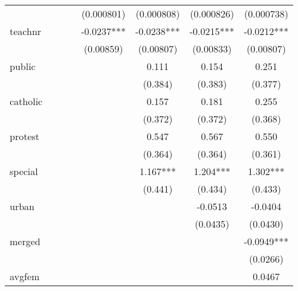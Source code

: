 \begin{table}[htbp]
\begin{tabular}{l*{7}{c}}
            &               &               &               &  (0.000801)   &  (0.000808)   &  (0.000826)   &  (0.000738)   \\
[1em]
teachnr     &               &               &               &     -0.0237***&     -0.0238***&     -0.0215***&     -0.0212***\\
            &               &               &               &   (0.00859)   &   (0.00807)   &   (0.00833)   &   (0.00807)   \\
[1em]
public      &               &               &               &               &       0.111   &       0.154   &       0.251   \\
            &               &               &               &               &     (0.384)   &     (0.383)   &     (0.377)   \\
[1em]
catholic    &               &               &               &               &       0.157   &       0.181   &       0.255   \\
            &               &               &               &               &     (0.372)   &     (0.372)   &     (0.368)   \\
[1em]
protest     &               &               &               &               &       0.547   &       0.567   &       0.550   \\
            &               &               &               &               &     (0.364)   &     (0.364)   &     (0.361)   \\
[1em]
special     &               &               &               &               &       1.167***&       1.204***&       1.302***\\
            &               &               &               &               &     (0.441)   &     (0.434)   &     (0.433)   \\
[1em]
urban       &               &               &               &               &               &     -0.0513   &     -0.0404   \\
            &               &               &               &               &               &    (0.0435)   &    (0.0430)   \\
[1em]
merged      &               &               &               &               &               &               &     -0.0949***\\
            &               &               &               &               &               &               &    (0.0266)   \\
[1em]
avgfem      &               &               &               &               &               &               &      0.0467   \\

\end{tabular}
\end{table}
